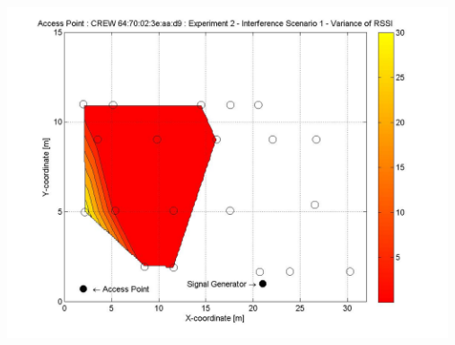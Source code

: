 \documentclass[11pt,a4paper,headinclude,footinclude,chapterprefix=on]{scrreprt}
\begin{document}
\begin{longtable}
	\includegraphics[width=13cm]{../../Source/plot/CREW_d9/d9_Sig_Ex_2_Variance.jpg} \\
\end{longtable}
\end{document}
